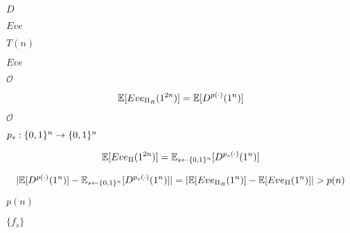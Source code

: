 \documentclass[10pt]{book}
\begin{document}
\begin{mdSnippets}
\begin{mdInlineSnippet}[f623e75af30e62bbd73d6df5b50bb7b5]%
$D$\end{mdInlineSnippet}%
\begin{mdInlineSnippet}%
$Eve$\end{mdInlineSnippet}%
\begin{mdInlineSnippet}[514884be093e9ab7909b0d394e7b74d2]%
$T(n)$\end{mdInlineSnippet}%
\begin{mdInlineSnippet}%
$Eve$\end{mdInlineSnippet}%
\begin{mdInlineSnippet}[c739e7b1285679250be773ba8e183209]%
$\mathcal{O}$\end{mdInlineSnippet}%
\begin{mdDisplaySnippet}[c4e07b269eb69abbd696354b684c7b54]%
\[%
\E[Eve_{\Pi_R}(1^{2n})] = \E[D^{p(\cdot)}(1^n)]
\]%
\end{mdDisplaySnippet}%
\begin{mdInlineSnippet}[c739e7b1285679250be773ba8e183209]%
$\mathcal{O}$\end{mdInlineSnippet}%
\begin{mdInlineSnippet}%
$p_s: \{0,1\}^n \to \{0,1\}^n$\end{mdInlineSnippet}%
\begin{mdDisplaySnippet}[64f17cc7b139f656b9de7b270e70a486]%
\[%
\E[Eve_{\Pi}(1^{2n})] = \E_{s \gets \zo^n}[D^{p_s(\cdot)}(1^n)]
\]%
\end{mdDisplaySnippet}%
\begin{mdDisplaySnippet}[4aa2ff5f6258ea3efebd3d4cd4668be8]%
\[%
|\E[D^{p(\cdot)}(1^n)] -  \E_{s \gets \zo^n}[D^{p_s(\cdot)}(1^n)] | = |\E[Eve_{\Pi_R}(1^n)] - \E[Eve_{\Pi}(1^n)] | > p(n)
\]%
\end{mdDisplaySnippet}%
\begin{mdInlineSnippet}%
$p(n)$\end{mdInlineSnippet}%
\begin{mdInlineSnippet}[f0a0745b39ca7c74b201f7784e766521]%
$\{f_s\}$\end{mdInlineSnippet}%

\end{mdSnippets}
\end{document}
